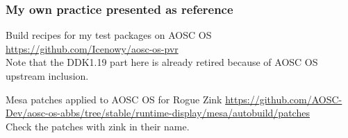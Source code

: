 \documentclass{beamer}
\begin{document}
\begin{frame}
	\frametitle{My own practice presented as reference}
	\begin{block}{Build recipes for my test packages on AOSC OS}
		\url{https://github.com/Icenowy/aosc-os-pvr} \\
		Note that the DDK1.19 part here is already retired because of AOSC OS upstream inclusion.
	\end{block}
	\begin{block}{Mesa patches applied to AOSC OS for Rogue Zink}
		\url{https://github.com/AOSC-Dev/aosc-os-abbs/tree/stable/runtime-display/mesa/autobuild/patches} \\
		Check the patches with zink in their name.
	\end{block}
\end{frame}
\end{document}
